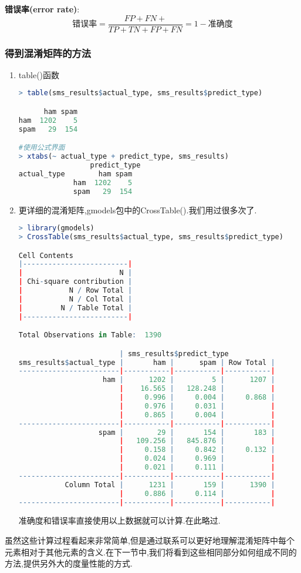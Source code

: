 \documentclass[11pt,a4paper,oneside]{book}
\begin{document}
\textbf{错误率(error rate)}:
\begin{equation}
	\mbox{错误率}=\frac{FP+FN+}{TP+TN+FP+FN}=1-\mbox{准确度}
\end{equation}

\subsubsection{得到混淆矩阵的方法}
\begin{enumerate}
\item table()函数
	
\begin{lstlisting}[language=r]
> table(sms_results$actual_type, sms_results$predict_type)

      ham spam
ham  1202    5
spam   29  154

#使用公式界面
> xtabs(~ actual_type + predict_type, sms_results)
                 predict_type
actual_type        ham spam
             ham  1202    5
             spam   29  154
\end{lstlisting}

\item 更详细的混淆矩阵,gmodels包中的CrossTable().我们用过很多次了.

\begin{lstlisting}[language=r]
> library(gmodels)
> CrossTable(sms_results$actual_type, sms_results$predict_type)

Cell Contents
|-------------------------|
|                       N |
| Chi-square contribution |
|           N / Row Total |
|           N / Col Total |
|         N / Table Total |
|-------------------------|

Total Observations in Table:  1390 

                        | sms_results$predict_type 
sms_results$actual_type |       ham |      spam | Row Total | 
------------------------|-----------|-----------|-----------|
                    ham |      1202 |         5 |      1207 | 
                        |    16.565 |   128.248 |           | 
                        |     0.996 |     0.004 |     0.868 | 
                        |     0.976 |     0.031 |           | 
                        |     0.865 |     0.004 |           | 
------------------------|-----------|-----------|-----------|
                   spam |        29 |       154 |       183 | 
                        |   109.256 |   845.876 |           | 
                        |     0.158 |     0.842 |     0.132 | 
                        |     0.024 |     0.969 |           | 
                        |     0.021 |     0.111 |           | 
------------------------|-----------|-----------|-----------|
           Column Total |      1231 |       159 |      1390 | 
                        |     0.886 |     0.114 |           | 
------------------------|-----------|-----------|-----------|
\end{lstlisting}
准确度和错误率直接使用以上数据就可以计算.在此略过.
\end{enumerate}
虽然这些计算过程看起来非常简单,但是通过联系可以更好地理解混淆矩阵中每个元素相对于其他元素的含义.在下一节中,我们将看到这些相同部分如何组成不同的方法,提供另外大的度量性能的方式.
\end{document}
